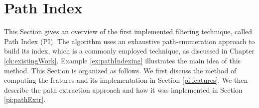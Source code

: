 \documentclass{l4proj}
\begin{document}

    
\section{Path Index}
\label{path-index}
This Section gives an overview of the first implemented filtering technique, called Path Index (PI). The algorithm uses an exhaustive path-enumeration approach to build its index, which is a commonly employed technique, as discussed in Chapter \ref{ch:existingWork}. Example \ref{ex:pathIndexing} illustrates the main idea of this method. This Section is organized as follows. We first discuss the method of computing the features and its implementation in Section \ref{pi:features}. We then describe the path extraction approach and how it was implemented in Section \ref{pi:pathExtr}.
\end{document}
